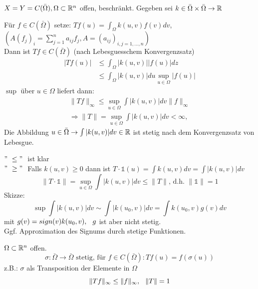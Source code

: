 \begin{beispiel}[Integraloperator] 
	$X = Y = C(\bar \Omega), \Omega \subset \mathbb{R}^{n}$ offen, beschränkt.
	Gegeben sei $k \in \bar \Omega \times \bar \Omega \rightarrow \mathbb{R} $
	
	Für $f \in C(\bar \Omega)$ setze: $Tf(u) = \int_{\Omega} k(u, v) f(v) dv$, \hspace{0.25cm}
	$( A( f_{j} )_{i} = \sum_{j = 1}^{n} a_{ij}f_{j}, A = (a_{ij})_{i,j = 1, \dotsc, n} )$ \\
	
	Dann ist $Tf \in C(\bar \Omega)$ (nach Lebesguesschem Konvergenzsatz)
	\begin{align*}
		|T f(u)| & \leq \int_{\Omega} |k(u, v)| |f(u)| dz \\
				 & \leq \int_{\Omega} |k(u, v)| du \sup_{u \in \Omega} | f(u) |
	\end{align*} 				 
	$\sup$ über $u \in \Omega$ liefert dann:
	\begin{align*}
		\| Tf \|_{\infty} \leq \sup_{u \in \Omega} \int |k(u,v)| dv \| f \|_{\infty} \\
		\Rightarrow \| T \| = \sup_{u \in \Omega} \int |k(u, v)| dv < \infty,
	\end{align*} 	
	Die Abbildung $u \in \bar \Omega \rightarrow \int |k(u, v)| dv \in \mathbb{R}$ ist stetig nach dem Konvergenzsatz von Lebesgue. \\
	\begin{beweis}
		$ "\ \leq "\ $ ist klar \\
		$ "\ \geq "\ $ Falls $ k(u, v) \geq 0$ dann ist $T \cdot \mathds{1} (u) = \int k(u, v) dv = \int |k(u, v)| dv$ \\
		\[ \| T \cdot \mathds{1} \| = \sup_{u \in \Omega} \int |k(u, v)| dv \leq \| T \| \text{, d.h. } \| \mathds{1} \| = 1 \]
		Skizze:
		\[ \sup \int | k(u, v) | dv \sim \int | k(u_{0}, v) | dv = \int k(u_{0}, v) g(v) dv \]
		mit $g(v) = sign(v) k(u_{0}, v), \hspace{0.25cm} g$ ist aber nicht stetig. \\
		Ggf. Approximation des Signums durch stetige Funktionen.
	\end{beweis}
\end{beispiel}

\begin{beispiel}[Kompositionsoperator] 
$\Omega \subset \mathbb{R}^{n}$ offen. 
\[ \sigma : \bar \Omega \rightarrow \bar \Omega \text{ stetig, für } f \in C(\bar \Omega): Tf(u) = f(\sigma(u)) \]
z.B.: $\sigma$ als Transposition der Elemente in $\Omega$
\[ \| Tf \|_{\infty} \leq \| f \|_{\infty}, \hspace{0.25cm} \| T \| = 1 \]
\end{beispiel}

